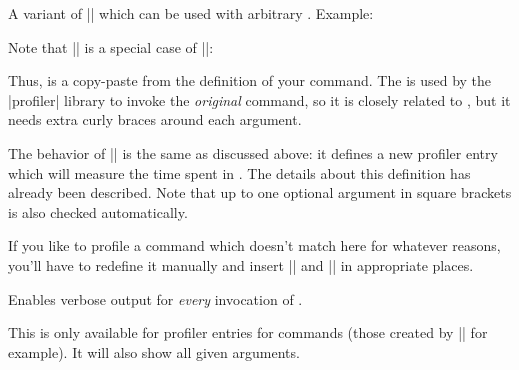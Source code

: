 \begin{command}{\pgfprofilenewforcommandpattern{}}
    A variant of |\pgfprofilenewforcommand| which can be used with arbitrary
    . Example:

    Note that |\pgfprofilenewforcommand| is a special case of
    |\pgfprofilenewforcommandpattern|:
\begin{codeexample}
\def\mymacro#1#2{ ... }
\pgfprofilenewforcommand{}
\end{codeexample}
    Thus,  is a copy-paste from the definition of your
    command. The  is used by the |profiler| library to
    invoke the \emph{original} command, so it is closely related to
    , but it needs extra curly braces around each
    argument.

    The behavior of |\pgfprofilenewforcommandpattern| is the same as discussed
    above: it defines a new profiler entry which will measure the time spent in
    . The details about this definition has already
    been described. Note that up to one optional argument in square brackets is
    also checked automatically.

    If you like to profile a command which doesn't match here for whatever
    reasons, you'll have to redefine it manually and insert |\pgfprofilestart|
    and |\pgfprofileend| in appropriate places.
\end{command}

\begin{command}{\pgfprofileshowinvocationsfor{}}
    Enables verbose output for \emph{every} invocation of .

    This is only available for profiler entries for commands (those created by
    |\pgfprofilenewforcommand| for example). It will also show all given
    arguments.
\end{command}


